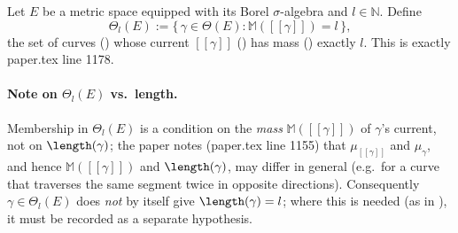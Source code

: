 \begin{definition}[$\Theta_l(E)$]
  Let $E$ be a metric space equipped with its Borel $\sigma$-algebra and $l \in \mathbb{N}$. Define
  \[
    \Theta_l(E) := \{\, \gamma \in \Theta(E) : \mathbb{M}([[\gamma]]) = l \,\}
    ,
  \]
  the set of curves () whose current $[[\gamma]]$ () has mass
  () exactly $l$. This is exactly paper.tex line 1178.

  \paragraph{Note on $\Theta_l(E)$ vs.\ length.} Membership in $\Theta_l(E)$ is a condition on the
  \emph{mass} $\mathbb{M}([[\gamma]])$ of $\gamma$'s current, not on $\length(\gamma)$; the paper
  notes (paper.tex line 1155) that $\mu_{[[\gamma]]}$ and $\mu_\gamma$, and hence
  $\mathbb{M}([[\gamma]])$ and $\length(\gamma)$, may differ in general (e.g.\ for a curve that
  traverses the same segment twice in opposite directions). Consequently $\gamma \in \Theta_l(E)$
  does \emph{not} by itself give $\length(\gamma) = l$; where this is needed (as in
  ), it must be recorded as a separate hypothesis.
\end{definition}
